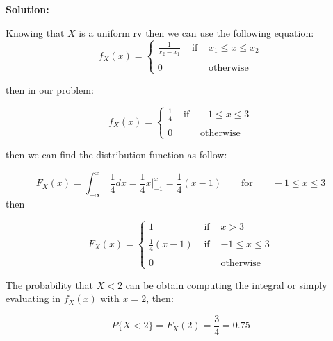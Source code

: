 \documentclass[10pt,a4paper]{article}
\begin{document}
\begin{enumerate}
	
	\textbf{Solution:}
	
	Knowing that $X$ is a uniform rv then we can use the following equation:
	\begin{equation}
		f_{X}(x)= \left\{ \begin{array}{lcl}
				\frac{1}{x_{2} - x_{1}} & \mbox{ if } & x_{1} \leq x  \leq x_{2}\\
				& & \\
				0 & \mbox{  } & \text{otherwise}
			\end{array}
		\right.
	\end{equation}
	
	then in our problem:

	\begin{tcolorbox}
	\begin{equation}
		f_{X}(x)= \left\{ \begin{array}{lcl}
				\frac{1}{4} & \mbox{ if } & -1 \leq x  \leq 3\\
				& & \\
				0 & \mbox{  } & \text{otherwise}
			\end{array}
		\right.
	\end{equation}
	\end{tcolorbox}
	
	then we can find the distribution function as follow:
	
	\begin{equation}
	 F_{X}(x) = \int_{-\infty}^{x} \frac{1}{4} dx = \frac{1}{4}x \biggr|^{x}_{-1} = \frac{1}{4}(x-1) \qquad \text{for} \qquad -1 \leq x  \leq 3
	 \end{equation}
	 then
	 
	 \begin{tcolorbox}
	\begin{equation}
		F_{X}(x)= \left\{ \begin{array}{lcl}
				1 & \mbox{ if } &  x  > 3\\
				& & \\
				\frac{1}{4}(x-1) & \mbox{ if } & -1 \leq x  \leq 3\\
				& & \\
				0 & \mbox{  } & \text{otherwise}
			\end{array}
		\right.
	\end{equation}
	\end{tcolorbox}
	 
	 The probability that $X < 2$ can be obtain computing the integral or simply evaluating in $f_{X}(x)$ with $x =2$, then:
	 
	 \begin{tcolorbox}
	\begin{equation}
		P\{ X < 2\} = F_{X}(2) = \frac{3}{4} = 0.75
	\end{equation}
	\end{tcolorbox}
	

\end{enumerate}
\end{document}
